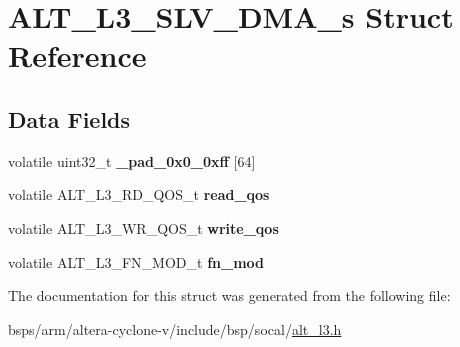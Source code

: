 \hypertarget{structALT__L3__SLV__DMA__s}{}\section{A\+L\+T\+\_\+\+L3\+\_\+\+S\+L\+V\+\_\+\+D\+M\+A\+\_\+s Struct Reference}
\label{structALT__L3__SLV__DMA__s}
\subsection*{Data Fields}
\begin{DoxyCompactItemize}
\item 
\mbox{\label{structALT__L3__SLV__DMA__s_a79d92853238270b8f97433fbbc8b5150}} 
volatile uint32\+\_\+t {\bfseries \+\_\+pad\+\_\+0x0\+\_\+0xff} \mbox{[}64\mbox{]}
\item 
\mbox{\label{structALT__L3__SLV__DMA__s_a4cfdf3c44a8ed76080f493f5090b3824}} 
volatile A\+L\+T\+\_\+\+L3\+\_\+\+R\+D\+\_\+\+Q\+O\+S\+\_\+t {\bfseries read\+\_\+qos}
\item 
\mbox{\label{structALT__L3__SLV__DMA__s_a6c17fd91056a041c1886396cbb26e45c}} 
volatile A\+L\+T\+\_\+\+L3\+\_\+\+W\+R\+\_\+\+Q\+O\+S\+\_\+t {\bfseries write\+\_\+qos}
\item 
\mbox{\label{structALT__L3__SLV__DMA__s_aef3ada9c9e745f702386d1797c1bd07e}} 
volatile A\+L\+T\+\_\+\+L3\+\_\+\+F\+N\+\_\+\+M\+O\+D\+\_\+t {\bfseries fn\+\_\+mod}
\end{DoxyCompactItemize}


The documentation for this struct was generated from the following file\+:\begin{DoxyCompactItemize}
\item 
bsps/arm/altera-\/cyclone-\/v/include/bsp/socal/\mbox{\hyperlink{alt__l3_8h}{alt\+\_\+l3.\+h}}\end{DoxyCompactItemize}
